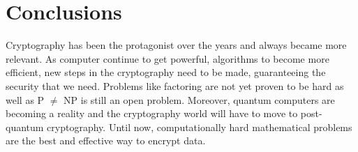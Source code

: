 \chapter{Conclusions}
\par
Cryptography has been the protagonist over the years and always became more relevant. As computer continue to get powerful, algorithms to become more efficient, new steps in the cryptography need to be made, guaranteeing the security that we need. Problems like factoring are not yet proven to be hard as well as P $\neq$ NP is still an open problem. Moreover, quantum computers are becoming a reality and the cryptography world will have to move to post-quantum cryptography. Until now, computationally hard mathematical problems are the best and effective way to encrypt data.
